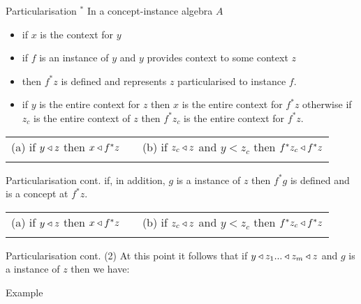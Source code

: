 \begin{frame}{Particularisation $^*$}
In a concept-instance algebra $A$

\begin{itemize}
\item if $x$ is the context for $y$
\item if $f$ is an instance of $y$ and $y$ provides context to some context $z$
\item then  $f^*z$  is defined and represents $z$ particularised to instance $f$.
\item if $y$ is the entire context for $z$ then $x$ is the entire context for $f^*z$
otherwise if $z_c$ is the entire context of $z$ then $f^*z_c$ is the entire context for $f^*z$.
\end{itemize}
\medskip
\pause
\begin{tabular} {c p{0.2cm} c}
(a) if $y \triangleleft z$ then $x \triangleleft f^*z$   &&   (b) if $z_c \triangleleft z$ and $y <z_c$ then $f^*z_c \triangleleft f^*z$ \\
&& \\
\end{tabular}
\end{frame}

\begin{frame}{Particularisation cont.}
if, in addition, $g$ is a instance of $z$ then $f^*g$ is defined and is a concept at $f^*z$. \\

\medskip
\pause
\begin{tabular} {c p{0.2cm} c}
(a) if $y \triangleleft z$ then $x \triangleleft f^*z$   &&   (b) if $z_c \triangleleft z$ and $y <z_c$ then $f^*z_c \triangleleft f^*z$ \\[0.5cm]
&& \\
\end{tabular}
\end{frame}

\begin{frame}{Particularisation cont. (2)}
At this point it follows that if $y \triangleleft z_1 ... \triangleleft z_m \triangleleft z$ and $g$ is a instance of $z$ then we have:
 
\end{frame}

\begin{frame}{Example}

\end{frame}







